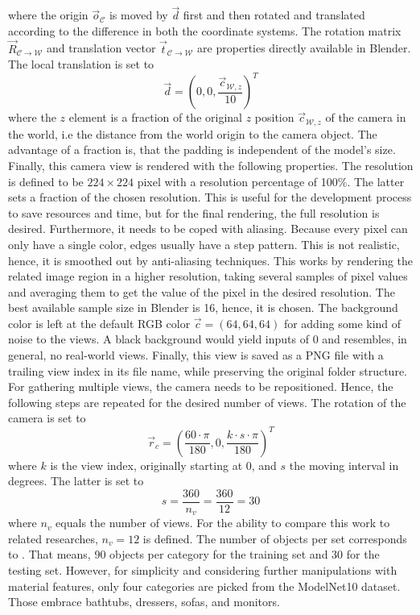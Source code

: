 where the origin $\vec{o}_{\mathcal{C}}$ is moved by $\vec{d}$ first and then rotated and translated according to the difference in both the coordinate systems.
The rotation matrix $\vec{R}_{\mathcal{C} \rightarrow \mathcal{W}}$ and translation vector $\vec{t}_{\mathcal{C} \rightarrow \mathcal{W}}$ are properties directly available in Blender.
The local translation is set to
\begin{equation}
	\vec{d} = \left( 0, 0, \frac{\vec{c}_{\mathcal{W}, z}}{10} \right)^T
\end{equation}
where the $z$ element is a fraction of the original $z$ position $\vec{c}_{\mathcal{W}, z}$ of the camera in the world, i.e the distance from the world origin to the camera object.
The advantage of a fraction is, that the padding is independent of the model's size.
Finally, this camera view is rendered with the following properties.
The resolution is defined to be $224 \times 224$ pixel with a resolution percentage of 100\%.
The latter sets a fraction of the chosen resolution.
This is useful for the development process to save resources and time, but for the final rendering, the full resolution is desired.
Furthermore, it needs to be coped with aliasing.
Because every pixel can only have a single color, edges usually have a step pattern.
This is not realistic, hence, it is smoothed out by anti-aliasing techniques.
This works by rendering the related image region in a higher resolution, taking several samples of pixel values and averaging them to get the value of the pixel in the desired resolution.
The best available sample size in Blender is 16, hence, it is chosen.
The background color is left at the default RGB color $\vec{c} = (64, 64, 64)$ for adding some kind of noise to the views.
A black background would yield inputs of 0 and resembles, in general, no real-world views.
Finally, this view is saved as a PNG file with a trailing view index in its file name, while preserving the original folder structure.
For gathering multiple views, the camera needs to be repositioned.
Hence, the following steps are repeated for the desired number of views.
The rotation of the camera is set to
\begin{equation}
	\vec{r}_c = \left(  \frac{60 \cdot \pi}{180}, 0, \frac{k \cdot s \cdot \pi}{180} \right)^T
\end{equation}
where $k$ is the view index, originally starting at 0, and $s$ the moving interval in degrees.
The latter is set to
\begin{equation}
	s = \frac{360}{n_v} = \frac{360}{12} = 30
\end{equation}
where $n_v$ equals the number of views.
For the ability to compare this work to related researches, $n_v = 12$ is defined.
The number of objects per set corresponds to \cite{Su:2015:MCN:2919332.2919750}.
That means, 90 objects per category for the training set and 30 for the testing set.
However, for simplicity and considering further manipulations with material features, only four categories are picked from the ModelNet10 dataset.
Those embrace bathtubs, dressers, sofas, and monitors.